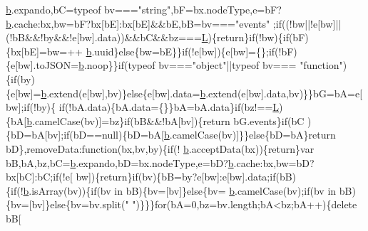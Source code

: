 \begin{DoxyCode}
      \hyperlink{jquery_8js_aa4026ad5544b958e54ce5e106fa1c805}{b}.expando,bC=typeof bv===\textcolor{stringliteral}{"string"},bF=bx.nodeType,e=bF?\hyperlink{jquery_8js_aa4026ad5544b958e54ce5e106fa1c805}{b}.cache:bx,bw=bF?bx[bE]:bx[bE]&&bE,bB=bv===\textcolor{stringliteral}{"events"}
      ;\textcolor{keywordflow}{if}((!bw||!e[bw]||(!bB&&!by&&!e[bw].data))&&bC&&bz===\hyperlink{jquery_8js_a38ee4c0b5f4fe2a18d0c783af540d253}{L})\{\textcolor{keywordflow}{return}\}\textcolor{keywordflow}{if}(!bw)\{\textcolor{keywordflow}{if}(bF)\{bx[bE]=bw=++
      \hyperlink{jquery_8js_aa4026ad5544b958e54ce5e106fa1c805}{b}.uuid\}\textcolor{keywordflow}{else}\{bw=bE\}\}\textcolor{keywordflow}{if}(!e[bw])\{e[bw]=\{\};\textcolor{keywordflow}{if}(!bF)\{e[bw].toJSON=\hyperlink{jquery_8js_aa4026ad5544b958e54ce5e106fa1c805}{b}.noop\}\}\textcolor{keywordflow}{if}(typeof bv===\textcolor{stringliteral}{"object"}||typeof bv===\textcolor{stringliteral}{
      "function"})\{\textcolor{keywordflow}{if}(by)\{e[bw]=\hyperlink{jquery_8js_aa4026ad5544b958e54ce5e106fa1c805}{b}.extend(e[bw],bv)\}\textcolor{keywordflow}{else}\{e[bw].data=\hyperlink{jquery_8js_aa4026ad5544b958e54ce5e106fa1c805}{b}.extend(e[bw].data,bv)\}\}bG=bA=e[bw];\textcolor{keywordflow}{if}(!by)\{\textcolor{keywordflow}{
      if}(!bA.data)\{bA.data=\{\}\}bA=bA.data\}\textcolor{keywordflow}{if}(bz!==\hyperlink{jquery_8js_a38ee4c0b5f4fe2a18d0c783af540d253}{L})\{bA[\hyperlink{jquery_8js_aa4026ad5544b958e54ce5e106fa1c805}{b}.camelCase(bv)]=bz\}\textcolor{keywordflow}{if}(bB&&!bA[bv])\{\textcolor{keywordflow}{return} bG.events\}\textcolor{keywordflow}{if}(bC
      )\{bD=bA[bv];\textcolor{keywordflow}{if}(bD==null)\{bD=bA[\hyperlink{jquery_8js_aa4026ad5544b958e54ce5e106fa1c805}{b}.camelCase(bv)]\}\}\textcolor{keywordflow}{else}\{bD=bA\}\textcolor{keywordflow}{return} bD\},removeData:\textcolor{keyword}{function}(bx,bv,by)\{\textcolor{keywordflow}{if}(!
      \hyperlink{jquery_8js_aa4026ad5544b958e54ce5e106fa1c805}{b}.acceptData(bx))\{\textcolor{keywordflow}{return}\}var bB,bA,bz,bC=\hyperlink{jquery_8js_aa4026ad5544b958e54ce5e106fa1c805}{b}.expando,bD=bx.nodeType,e=bD?\hyperlink{jquery_8js_aa4026ad5544b958e54ce5e106fa1c805}{b}.cache:bx,bw=bD?bx[bC]:bC;\textcolor{keywordflow}{if}(!e[
      bw])\{\textcolor{keywordflow}{return}\}\textcolor{keywordflow}{if}(bv)\{bB=by?e[bw]:e[bw].data;\textcolor{keywordflow}{if}(bB)\{\textcolor{keywordflow}{if}(!\hyperlink{jquery_8js_aa4026ad5544b958e54ce5e106fa1c805}{b}.isArray(bv))\{\textcolor{keywordflow}{if}(bv in bB)\{bv=[bv]\}\textcolor{keywordflow}{else}\{bv=
      \hyperlink{jquery_8js_aa4026ad5544b958e54ce5e106fa1c805}{b}.camelCase(bv);\textcolor{keywordflow}{if}(bv in bB)\{bv=[bv]\}\textcolor{keywordflow}{else}\{bv=bv.split(\textcolor{stringliteral}{" "})\}\}\}\textcolor{keywordflow}{for}(bA=0,bz=bv.length;bA<bz;bA++)\{\textcolor{keyword}{delete} bB[

\end{DoxyCode}
